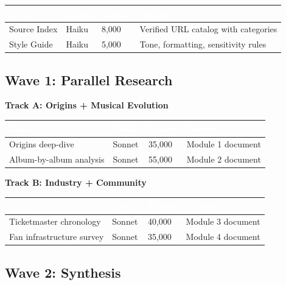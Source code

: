 \documentclass[11pt,letterpaper]{article}
\newcommand{\tableheader}[1]{\textbf{\sffamily\textcolor{white}{#1}}}
\begin{document}
\begin{center}
\begin{tabularx}{\textwidth}{L{3cm}C{1.5cm}C{1.5cm}X}
\toprule
{}
\tableheader{Task} & \tableheader{Model} & \tableheader{Tokens} & \tableheader{Output} \\
\midrule
Source Index & Haiku & 8,000 & Verified URL catalog with categories \\
Style Guide & Haiku & 5,000 & Tone, formatting, sensitivity rules \\
\bottomrule
\end{tabularx}
\end{center}

\subsection{Wave 1: Parallel Research}

\textbf{Track A: Origins + Musical Evolution}

\begin{center}
\begin{tabularx}{\textwidth}{L{3.5cm}C{1.5cm}C{1.5cm}X}
\toprule
{}
\tableheader{Task} & \tableheader{Model} & \tableheader{Tokens} & \tableheader{Output} \\
\midrule
Origins deep-dive & Sonnet & 35,000 & Module 1 document \\
Album-by-album analysis & Sonnet & 55,000 & Module 2 document \\
\bottomrule
\end{tabularx}
\end{center}

\textbf{Track B: Industry + Community}

\begin{center}
\begin{tabularx}{\textwidth}{L{3.5cm}C{1.5cm}C{1.5cm}X}
\toprule
{}
\tableheader{Task} & \tableheader{Model} & \tableheader{Tokens} & \tableheader{Output} \\
\midrule
Ticketmaster chronology & Sonnet & 40,000 & Module 3 document \\
Fan infrastructure survey & Sonnet & 35,000 & Module 4 document \\
\bottomrule
\end{tabularx}
\end{center}

\subsection{Wave 2: Synthesis}
\end{document}
